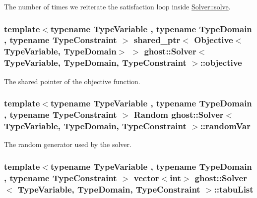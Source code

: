 The number of times we reiterate the satisfaction loop inside \hyperlink{classghost_1_1Solver_af025b99595aeff4fd9a174bcbd66a991}{Solver\-::solve}. 

\hypertarget{classghost_1_1Solver_a4fd74bd68d0ea253fd35adad697f964d}{
\subsubsection[{objective}]{\setlength{\rightskip}{0pt plus 5cm}template$<$typename Type\-Variable , typename Type\-Domain , typename Type\-Constraint $>$ shared\-\_\-ptr$<$ {\bf Objective}$<$Type\-Variable, Type\-Domain$>$ $>$ {\bf ghost\-::\-Solver}$<$ Type\-Variable, Type\-Domain, Type\-Constraint $>$\-::objective\hspace{0.3cm}{\ttfamily [private]}}}\label{classghost_1_1Solver_a4fd74bd68d0ea253fd35adad697f964d}


The shared pointer of the objective function. 

\hypertarget{classghost_1_1Solver_acec87a0a0adcc3a8d794a1ff84718201}{
\subsubsection[{random\-Var}]{\setlength{\rightskip}{0pt plus 5cm}template$<$typename Type\-Variable , typename Type\-Domain , typename Type\-Constraint $>$ {\bf Random} {\bf ghost\-::\-Solver}$<$ Type\-Variable, Type\-Domain, Type\-Constraint $>$\-::random\-Var\hspace{0.3cm}{\ttfamily [private]}}}\label{classghost_1_1Solver_acec87a0a0adcc3a8d794a1ff84718201}


The random generator used by the solver. 

\hypertarget{classghost_1_1Solver_aa5c12894a6fbd524fb33906c8f3fbcae}{
\subsubsection[{tabu\-List}]{\setlength{\rightskip}{0pt plus 5cm}template$<$typename Type\-Variable , typename Type\-Domain , typename Type\-Constraint $>$ vector$<$int$>$ {\bf ghost\-::\-Solver}$<$ Type\-Variable, Type\-Domain, Type\-Constraint $>$\-::tabu\-List\hspace{0.3cm}{\ttfamily [private]}}}\label{classghost_1_1Solver_aa5c12894a6fbd524fb33906c8f3fbcae}


